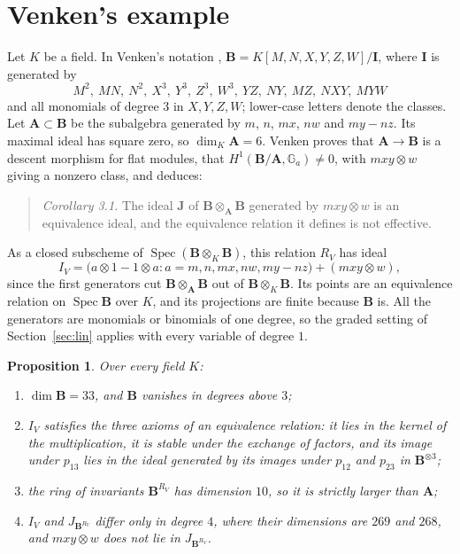 \documentclass[11pt,a4paper]{amsart}
\newtheorem{proposition}[theorem]{Proposition}
\theoremstyle{remark}
\begin{document}
\section{Venken's example}\label{sec:venken}

Let $K$ be a field. In Venken's notation \cite{venken}, $\mathbf B = K[M, N, X, Y, Z, W]/\mathbf I$, where $\mathbf I$ is generated by
\[
M^2,\ MN,\ N^2,\ X^3,\ Y^3,\ Z^3,\ W^3,\ YZ,\ NY,\ MZ,\ NXY,\ MYW
\]
and all monomials of degree $3$ in $X, Y, Z, W$; lower-case letters denote the classes. Let $\mathbf A \subset \mathbf B$ be the subalgebra generated by $m$, $n$, $mx$, $nw$ and $my - nz$. Its maximal ideal has square zero, so $\dim_K \mathbf A = 6$. Venken proves that $\mathbf A \to \mathbf B$ is a descent morphism for flat modules, that $H^1(\mathbf B/\mathbf A, \mathbb G_a) \ne 0$, with $mxy \otimes w$ giving a nonzero class, and deduces:

\begin{quote}
\emph{Corollary 3.1.} The ideal $\mathbf J$ of $\mathbf B \otimes_{\mathbf A} \mathbf B$ generated by $mxy \otimes w$ is an equivalence ideal, and the equivalence relation it defines is not effective.
\end{quote}

As a closed subscheme of $\operatorname{Spec}(\mathbf B \otimes_K \mathbf B)$, this relation $R_V$ has ideal
\[
I_V = \bigl(a \otimes 1 - 1 \otimes a : a = m, n, mx, nw, my - nz\bigr) + (mxy \otimes w),
\]
since the first generators cut $\mathbf B \otimes_{\mathbf A} \mathbf B$ out of $\mathbf B \otimes_K \mathbf B$. Its points are an equivalence relation on $\operatorname{Spec} \mathbf B$ over $K$, and its projections are finite because $\mathbf B$ is. All the generators are monomials or binomials of one degree, so the graded setting of Section~\ref{sec:lin} applies with every variable of degree $1$.

\begin{proposition}\label{prop:venken}
Over every field $K$:
\begin{enumerate}
\item $\dim \mathbf B = 33$, and $\mathbf B$ vanishes in degrees above $3$;
\item $I_V$ satisfies the three axioms of an equivalence relation: it lies in the kernel of the multiplication, it is stable under the exchange of factors, and its image under $p_{13}$ lies in the ideal generated by its images under $p_{12}$ and $p_{23}$ in $\mathbf B^{\otimes 3}$;
\item the ring of invariants $\mathbf B^{R_V}$ has dimension $10$, so it is strictly larger than $\mathbf A$;
\item $I_V$ and $J_{\mathbf B^{R_V}}$ differ only in degree $4$, where their dimensions are $269$ and $268$, and $mxy \otimes w$ does not lie in $J_{\mathbf B^{R_V}}$.
\end{enumerate}
\end{proposition}
\end{document}
